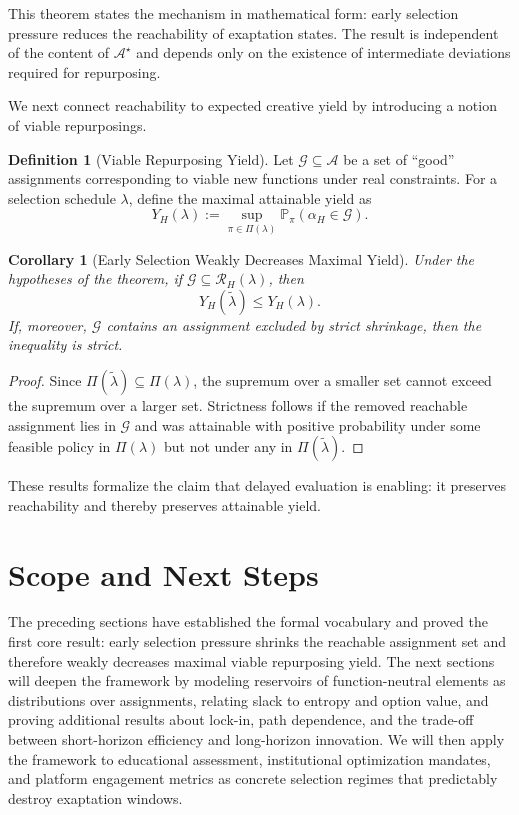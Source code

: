 \documentclass[11pt]{article}
\newtheorem{corollary}{Corollary}
\theoremstyle{definition}
\newtheorem{definition}{Definition}
\begin{document}
This theorem states the mechanism in mathematical form: early selection pressure reduces the reachability of exaptation states. The result is independent of the content of $\mathcal{A}^\star$ and depends only on the existence of intermediate deviations required for repurposing.

We next connect reachability to expected creative yield by introducing a notion of viable repurposings.

\begin{definition}[Viable Repurposing Yield]
Let $\mathcal{G}\subseteq \mathcal{A}$ be a set of ``good'' assignments corresponding to viable new functions under real constraints. For a selection schedule $\lambda$, define the maximal attainable yield as
\[
Y_H(\lambda) := \sup_{\pi\in\Pi(\lambda)} \mathbb{P}_\pi(\alpha_H\in \mathcal{G}).
\]
\end{definition}

\begin{corollary}[Early Selection Weakly Decreases Maximal Yield]
Under the hypotheses of the theorem, if $\mathcal{G}\subseteq \mathcal{R}_H(\lambda)$, then
\[
Y_H(\tilde{\lambda}) \le Y_H(\lambda).
\]
If, moreover, $\mathcal{G}$ contains an assignment excluded by strict shrinkage, then the inequality is strict.
\end{corollary}

\begin{proof}
Since $\Pi(\tilde{\lambda})\subseteq \Pi(\lambda)$, the supremum over a smaller set cannot exceed the supremum over a larger set. Strictness follows if the removed reachable assignment lies in $\mathcal{G}$ and was attainable with positive probability under some feasible policy in $\Pi(\lambda)$ but not under any in $\Pi(\tilde{\lambda})$.
\end{proof}

These results formalize the claim that delayed evaluation is enabling: it preserves reachability and thereby preserves attainable yield.

\section{Scope and Next Steps}

The preceding sections have established the formal vocabulary and proved the first core result: early selection pressure shrinks the reachable assignment set and therefore weakly decreases maximal viable repurposing yield. The next sections will deepen the framework by modeling reservoirs of function-neutral elements as distributions over assignments, relating slack to entropy and option value, and proving additional results about lock-in, path dependence, and the trade-off between short-horizon efficiency and long-horizon innovation. We will then apply the framework to educational assessment, institutional optimization mandates, and platform engagement metrics as concrete selection regimes that predictably destroy exaptation windows.
\end{document}
